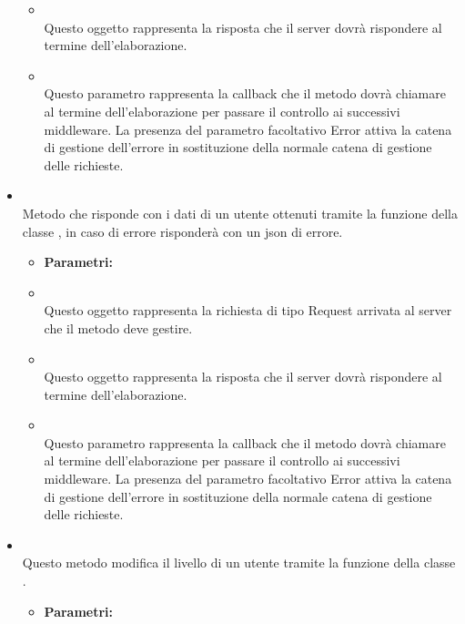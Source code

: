 \begin{itemize}
\begin{itemize}
						\item[]  \\ Questo oggetto rappresenta la risposta che il server dovrà rispondere al termine dell'elaborazione.	
						\item[]  \\ Questo parametro rappresenta la callback che il metodo dovrà chiamare al termine dell'elaborazione per passare il controllo ai successivi middleware. La presenza del parametro facoltativo Error attiva la catena di gestione dell'errore in sostituzione della normale catena di gestione delle richieste.	
				\end{itemize}
					\item[] \textbf{} \\ Metodo che risponde con i dati di un utente ottenuti tramite la funzione  della classe , in caso di errore risponderà con un json di errore.
						\begin{itemize}\addtolength{\itemsep}{-0.5\baselineskip}
						\item[] \textbf{Parametri:}
						\item[]  \\ Questo oggetto rappresenta la richiesta di tipo Request arrivata al server che il metodo deve gestire.	
						\item[]  \\ Questo oggetto rappresenta la risposta che il server dovrà rispondere al termine dell'elaborazione.	
						\item[]  \\ Questo parametro rappresenta la callback che il metodo dovrà chiamare al termine dell'elaborazione per passare il controllo ai successivi middleware. La presenza del parametro facoltativo Error attiva la catena di gestione dell'errore in sostituzione della normale catena di gestione delle richieste.	
				\end{itemize}
					\item[] \textbf{} \\ Questo metodo modifica il livello di un utente tramite la funzione  della classe .
						\begin{itemize}\addtolength{\itemsep}{-0.5\baselineskip}
						\item[] \textbf{Parametri:}

\end{itemize}
\end{itemize}
